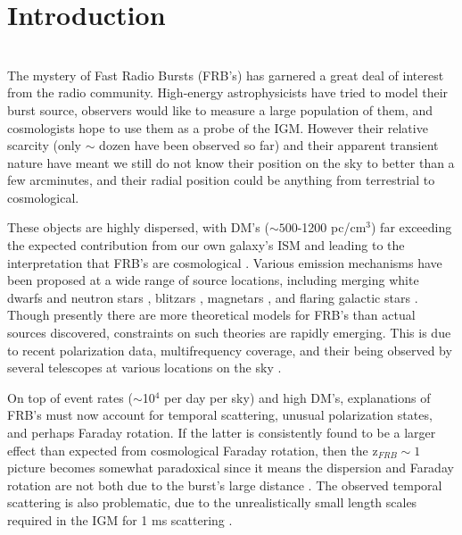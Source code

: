 \documentclass[useAMS,usenatbib]{emulateapj}
\begin{document}
\section{Introduction}
\\
The mystery of Fast Radio Bursts (FRB's) has garnered
a great deal of interest from the radio community.
High-energy astrophysicists have tried to model their burst source, 
observers would like to measure a large population of them, and cosmologists
hope to use them as a probe of the IGM. However their relative scarcity 
(only $\sim$ dozen have been observed so far) and their apparent 
transient nature have meant we still do not know their position on the sky
to better than a few arcminutes, and their radial position could be anything
from terrestrial to cosmological.

These objects are
highly dispersed, with DM's ($\sim 500$-1200 pc/cm$^3$) far exceeding
the expected contribution from our own galaxy's ISM and leading to the
interpretation that FRB's are cosmological \citep{2007Sci...318..777L, 2013Sci...341...53T}. 
Various emission mechanisms have been proposed 
at a wide range of source locations, 
including merging white dwarfs \citep{2012ApJ...760...64M}
and neutron stars \citep{2013PASJ...65L..12T},
blitzars \citep{2014A&A...562A.137F}, 
magnetars \citep{2015arXiv150101341P, 2014MNRAS.442L...9L}, 
and flaring galactic stars \citep{2004ApJ...615..253P}.
Though presently there are more theoretical models for FRB's than actual 
sources discovered, constraints on such theories are rapidly emerging. 
This is due to recent polarization data, 
multifrequency coverage, and their being observed by several telescopes
at various locations on the sky \citep{2014ApJ...780L...2B, 2014arXiv1412.0342P}. 

On top of event rates ($\sim$10$^4$ per day per sky) 
and high DM's, explanations of FRB's must now
account for temporal scattering, unusual polarization states, 
and perhaps Faraday rotation. If the latter is consistently found 
to be a larger effect than expected from cosmological Faraday rotation, 
then the z$_{FRB} \sim 1$ picture becomes somewhat
paradoxical since it means the dispersion and Faraday rotation are not both due to
the burst's large distance \citep{2015A&A...575A.118O}. 
The observed temporal scattering is also problematic, due 
to the unrealistically small length scales required in the IGM 
for 1 ms scattering \citep{2014ApJ...785L..26L}. 
\end{document}
